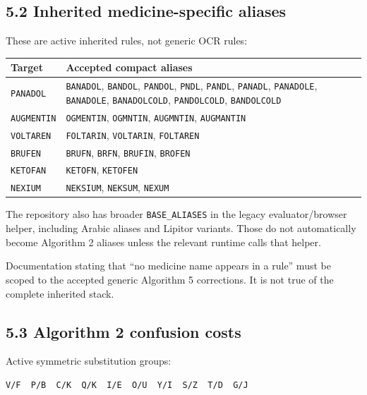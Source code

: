 \subsection{5.2 Inherited medicine-specific aliases}\label{52-inherited-medicine-specific-aliases}

These are active inherited rules, not generic OCR rules:

{\def\LTcaptype{none} %
\begin{longtable}[]{@{}>{\RaggedRight\arraybackslash}p{.27\linewidth}>{\RaggedRight\arraybackslash}p{.66\linewidth}@{}}
\toprule\noalign{}
Target & Accepted compact aliases \\
\midrule\noalign{}
\endhead
\bottomrule\noalign{}
\endlastfoot
\texttt{PANADOL} & \texttt{BANADOL}, \texttt{BANDOL}, \texttt{PANDOL}, \texttt{PNDL}, \texttt{PANDL}, \texttt{PANADL}, \texttt{PANADOLE}, \texttt{BANADOLE}, \texttt{BANADOLCOLD}, \texttt{PANDOLCOLD}, \texttt{BANDOLCOLD} \\
\texttt{AUGMENTIN} & \texttt{OGMENTIN}, \texttt{OGMNTIN}, \texttt{AUGMNTIN}, \texttt{AUGMANTIN} \\
\texttt{VOLTAREN} & \texttt{FOLTARIN}, \texttt{VOLTARIN}, \texttt{FOLTAREN} \\
\texttt{BRUFEN} & \texttt{BRUFN}, \texttt{BRFN}, \texttt{BRUFIN}, \texttt{BROFEN} \\
\texttt{KETOFAN} & \texttt{KETOFN}, \texttt{KETOFEN} \\
\texttt{NEXIUM} & \texttt{NEKSIUM}, \texttt{NEKSUM}, \texttt{NEXUM} \\
\end{longtable}
}

The repository also has broader \texttt{BASE\_\allowbreak{}ALIASES} in the legacy evaluator/browser helper, including Arabic aliases and Lipitor variants. Those do not automatically become Algorithm 2 aliases unless the relevant runtime calls that helper.

Documentation stating that ``no medicine name appears in a rule'' must be scoped to the accepted generic Algorithm 5 corrections. It is not true of the complete inherited stack.

\subsection{5.3 Algorithm 2 confusion costs}\label{53-algorithm-2-confusion-costs}

Active symmetric substitution groups:

\begin{verbatim}
V/F  P/B  C/K  Q/K  I/E  O/U  Y/I  S/Z  T/D  G/J
\end{verbatim}

